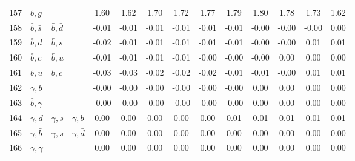 \begin{tabularx}{\textwidth}{rXXX@{}S@{}S@{}S@{}S@{}S@{}S@{}S@{}S@{}S@{}S}
157 & $\bar b, g$      &                   &                  &  1.60 &  1.62 &  1.70 &  1.72 &  1.77 &  1.79 &  1.80 &  1.78 &  1.73 &  1.62 \\
158 & $\bar b, \bar s$ & $\bar b, \bar d$  &                  & -0.01 & -0.01 & -0.01 & -0.01 & -0.01 & -0.01 & -0.00 & -0.00 & -0.00 &  0.00 \\
159 & $\bar b, d$      & $\bar b, s$       &                  & -0.02 & -0.01 & -0.01 & -0.01 & -0.01 & -0.01 & -0.00 & -0.00 &  0.01 &  0.01 \\
160 & $\bar b, \bar c$ & $\bar b, \bar u$  &                  & -0.01 & -0.01 & -0.01 & -0.01 & -0.00 & -0.00 & -0.00 &  0.00 &  0.00 &  0.00 \\
161 & $\bar b, u$      & $\bar b, c$       &                  & -0.03 & -0.03 & -0.02 & -0.02 & -0.02 & -0.01 & -0.01 & -0.00 &  0.01 &  0.01 \\
162 & $\gamma, b$      &                   &                  & -0.00 & -0.00 & -0.00 & -0.00 & -0.00 & -0.00 &  0.00 &  0.00 &  0.00 &  0.00 \\
163 & $\bar b, \gamma$ &                   &                  & -0.00 & -0.00 & -0.00 & -0.00 & -0.00 & -0.00 &  0.00 &  0.00 &  0.00 &  0.00 \\
164 & $\gamma,  d$     & $\gamma, s$       & $\gamma, b$      &  0.00 &  0.00 &  0.00 &  0.00 &  0.00 &  0.01 &  0.01 &  0.01 &  0.01 &  0.01 \\
165 & $\gamma, \bar b$ & $\gamma, \bar s$  & $\gamma, \bar d$ &  0.00 &  0.00 &  0.00 &  0.00 &  0.00 &  0.00 &  0.00 &  0.00 &  0.00 &  0.00 \\
166 & $\gamma, \gamma$ &                   &                  &  0.00 &  0.00 &  0.00 &  0.00 &  0.00 &  0.00 &  0.00 &  0.00 &  0.00 &  0.00 \\
\bottomrule
\end{tabularx}
